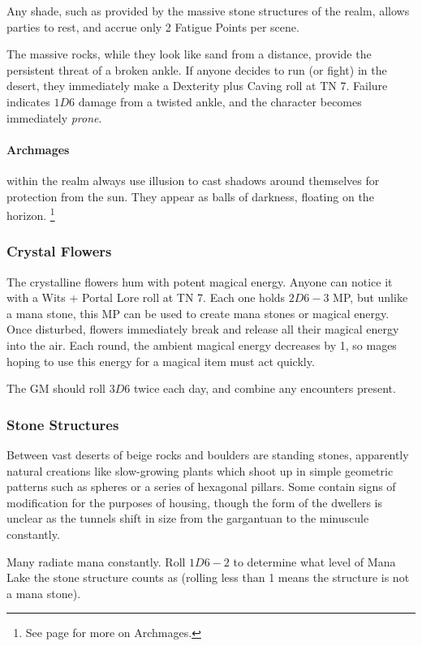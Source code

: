 \begin{multicols}{2}
Any shade, such as provided by the massive stone structures of the realm, allows parties to rest, and accrue only 2 Fatigue Points per scene.

The massive rocks, while they look like sand from a distance, provide the persistent threat of a broken ankle.
If anyone decides to run (or fight) in the desert, they immediately make a Dexterity plus Caving roll at TN 7.
Failure indicates $1D6$ damage from a twisted ankle, and the character becomes immediately \emph{prone}.

\paragraph{Archmages} within the realm always use illusion to cast shadows around themselves for protection from the sun.
They appear as balls of darkness, floating on the horizon.%
\footnote{See page \pageref{archmage} for more on Archmages.}

\subsubsection{Crystal Flowers}

The crystalline flowers hum with potent magical energy.
Anyone can notice it with a Wits + Portal Lore roll at TN 7.
Each one holds $2D6-3$ MP, but unlike a mana stone, this MP can be used to create mana stones or magical energy.
Once disturbed, flowers immediately break and release all their magical energy into the air.
Each round, the ambient magical energy decreases by 1, so mages hoping to use this energy for a magical item must act quickly.

The GM should roll $3D6$ twice each day, and combine any encounters present.

\subsubsection{Stone Structures}

Between vast deserts of beige rocks and boulders are standing stones, apparently natural creations like slow-growing plants which shoot up in simple geometric patterns such as spheres or a series of hexagonal pillars.
Some contain signs of modification for the purposes of housing, though the form of the dwellers is unclear as the tunnels shift in size from the gargantuan to the minuscule constantly.

Many radiate mana constantly.
Roll $1D6-2$ to determine what level of Mana Lake the stone structure counts as (rolling less than 1 means the structure is not a mana stone).


\end{multicols}
